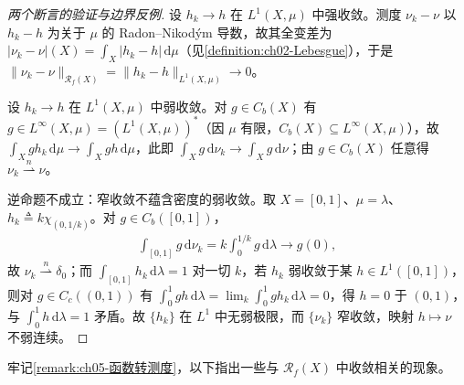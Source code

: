 \documentclass[../../main.tex]{subfiles}%
\begin{document}
\begin{proof}[两个断言的验证与边界反例]
设 $h_k\to h$ 在 $L^1(X,\mu)$ 中强收敛。测度 $\nu_k-\nu$ 以 $h_k-h$ 为关于 $\mu$ 的 Radon–Nikodým 导数，故其全变差为 $|\nu_k-\nu|(X)=\int_X|h_k-h|\,\mathrm{d}\mu$（见\cref{definition:ch02-Lebesgue}），于是 $\|\nu_k-\nu\|_{\mathscr{R}_f(X)}=\|h_k-h\|_{L^1(X,\mu)}\to0$。

设 $h_k\to h$ 在 $L^1(X,\mu)$ 中弱收敛。对 $g\in C_b(X)$ 有 $g\in L^\infty(X,\mu)=(L^1(X,\mu))^*$（因 $\mu$ 有限，$C_b(X)\subseteq L^\infty(X,\mu)$），故 $\int_X gh_k\,\mathrm{d}\mu\to\int_X gh\,\mathrm{d}\mu$，此即 $\int_X g\,\mathrm{d}\nu_k\to\int_X g\,\mathrm{d}\nu$；由 $g\in C_b(X)$ 任意得 $\nu_k\stackrel{n}{\rightharpoonup}\nu$。

逆命题不成立：窄收敛不蕴含密度的弱收敛。取 $X=[0,1]$、$\mu=\lambda$、$h_k\triangleq k\chi_{(0,1/k)}$。对 $g\in C_b([0,1])$，
\begin{align*}
\int_{[0,1]}g\,\mathrm{d}\nu_k=k\int_0^{1/k}g\,\mathrm{d}\lambda\longrightarrow g(0),
\end{align*}
故 $\nu_k\stackrel{n}{\rightharpoonup}\delta_0$；而 $\int_{[0,1]}h_k\,\mathrm{d}\lambda=1$ 对一切 $k$，若 $h_k$ 弱收敛于某 $h\in L^1([0,1])$，则对 $g\in C_c((0,1))$ 有 $\int_0^1gh\,\mathrm{d}\lambda=\lim_k\int_0^1gh_k\,\mathrm{d}\lambda=0$，得 $h=0$ 于 $(0,1)$，与 $\int_0^1h\,\mathrm{d}\lambda=1$ 矛盾。故 $\{h_k\}$ 在 $L^1$ 中无弱极限，而 $\{\nu_k\}$ 窄收敛，映射 $h\mapsto\nu$ 不弱连续。
\end{proof}

牢记\cref{remark:ch05-函数转测度}，以下指出一些与 $\mathscr{R}_f(X)$ 中收敛相关的现象。
\end{document}
